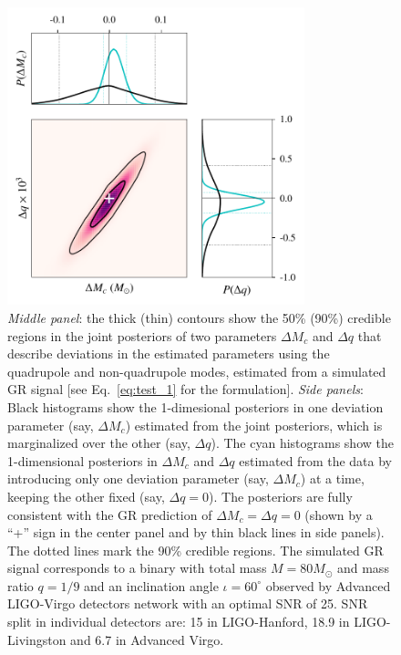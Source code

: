 \documentclass[prd,preprintnumbers,twocolumn,eqsecnum,floatfix,a4paper,nofootinbib,superscriptaddress]{revtex4}
\begin{document}
\begin{figure}[tb] \begin{center}
		\includegraphics[width=3.4in]{figs/hm_mcq_GR.pdf}
		\caption{\emph{Middle panel}: the thick (thin) contours show the 50\% (90\%) credible regions in the joint posteriors of two parameters $\Delta M_c$ and $\Delta q$ that describe deviations in the estimated parameters using the quadrupole and non-quadrupole modes, estimated from a simulated GR signal [see Eq.~\eqref{eq:test_1} for the formulation]. \emph{Side panels}: Black histograms show the 1-dimesional posteriors in one deviation parameter (say, $\Delta M_c$) estimated from the joint posteriors, which is marginalized over the other (say, $\Delta q$). The cyan histograms show the 1-dimensional posteriors in $\Delta M_c$ and $\Delta q$ estimated from the data by introducing only one deviation parameter (say, $\Delta M_c$) at a time, keeping the other fixed (say, $\Delta q = 0$). The posteriors are fully consistent with the GR prediction of $\Delta M_c = \Delta q = 0$ (shown by a ``+'' sign in the center panel and by thin black lines in side panels). The dotted lines mark the 90\% credible regions. The simulated GR signal corresponds to a binary with total mass $M = {80}M_\odot$ and mass ratio $q = 1/9$ and an inclination angle $\iota = {60^\circ}$ observed by Advanced LIGO-Virgo detectors network with an optimal SNR of 25. SNR split in individual detectors are: 15 in LIGO-Hanford, 18.9 in LIGO-Livingston and 6.7 in Advanced Virgo.}
		\label{fig:posterior_BBH_GR_inj}
\end{center} \end{figure}
\end{document}
